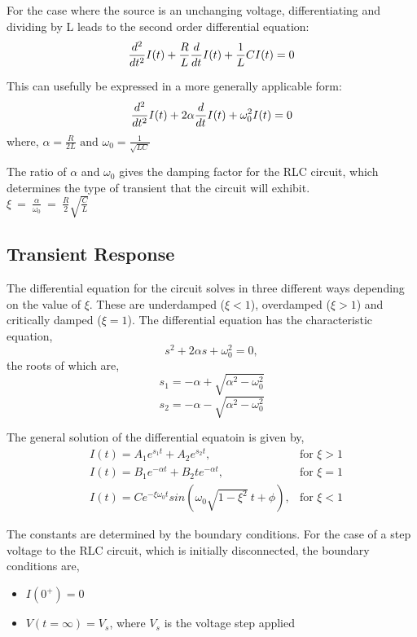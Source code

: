 \documentclass[12pt, twosides]{article}
\newcommand{\voltage}{\ensuremath{V}}
\newcommand{\curr}{I}
\newcommand{\res}{R}
\newcommand{\capc}{C}
\newcommand{\ind}{L}
\newcommand{\der}[1]{
\ifnum#1=1
	\frac{d}{dt}
\else
	\frac{d^#1}{dt^#1}
\fi
}
\begin{document}
		\noindent
		For the case where the source is an unchanging voltage, differentiating and dividing by L leads to the second order differential equation:
		\[ \der{2} \curr(t) + \frac{\res}{\ind} \der{1} \curr(t) + \frac{1}{\ind}{\capc} \curr(t) = 0 \]
		
		\noindent
		This can usefully be expressed in a more generally applicable form:
		\[ \der{2} \curr(t) + 2 \alpha \der{1} \curr(t) + \omega_0^2 \curr(t) = 0 \]
		where, \( \alpha = \frac{\res}{2 \ind} \text{ and } \omega_0 = \frac{1}{\sqrt{\ind \capc}} \)

		The ratio of \(\alpha\) and \(\omega_0\)  gives the damping factor for the RLC circuit, which determines the type of transient that the circuit  will exhibit.\\
		\(\xi \ = \ \frac{\alpha}{\omega_0} \ = \ \frac{R}{2} \sqrt{\frac{\capc}{\ind}} \)
		
		\subsection{Transient Response}
			The differential equation for the circuit solves in three different ways depending on the value of \(\xi\).
			These are underdamped (\(\xi < 1\)), overdamped (\(\xi > 1\)) and critically damped (\(\xi = 1\)). The differential equation has the characteristic equation,
			\[ s^2 + 2 \alpha s + \omega_0^2 =0, \]
			the roots of which are,
			\[ s_1 = - \alpha + \sqrt{\alpha^2 - \omega_0^2} \]
			\[ s_2 = - \alpha - \sqrt{\alpha^2 - \omega_0^2} \]
			
			\noindent
			The general solution of the differential equatoin is given by,
			\begin{equation}
			\begin{aligned}
				& \curr(t) = A_1 e^{s_1 t} + A_2 e^{s_2 t},& \text{for } \xi > 1 \\
			 	& \curr(t) = B_1 e^{-\alpha t} + B_2 t e^{-\alpha t},&\text{for } \xi = 1 \\
				& \curr(t) = C e^{-\xi \omega_0 t} sin(\omega_0 \sqrt{1 - \xi^2}\  t + \phi),& \text{for } \xi < 1
			\end{aligned}
			\end{equation}

			\noindent
			The constants are determined by the boundary conditions. For the case of a step voltage to the RLC circuit, which is initially disconnected, the boundary conditions are,
			\begin{itemize}[leftmargin=*]
				\item \( \curr(0^+) = 0 \)
				\item \( \voltage(t=\infty) = \voltage_s\), 
				where \(\voltage_s\) is the voltage step applied
			\end{itemize}
\end{document}
